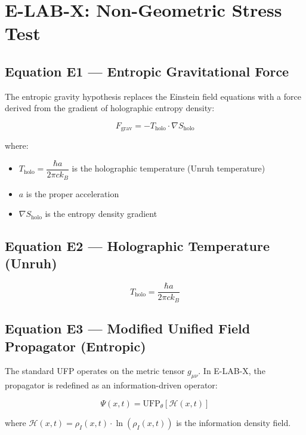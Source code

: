 
\section{E-LAB-X: Non-Geometric Stress Test}

\subsection{Equation E1 — Entropic Gravitational Force}

The entropic gravity hypothesis replaces the Einstein field equations with a force derived from the gradient of holographic entropy density:

\[
F_{\text{grav}} = -T_{\text{holo}} \cdot \nabla S_{\text{holo}}
\]

where:
\begin{itemize}
    \item $T_{\text{holo}} = \dfrac{\hbar a}{2\pi c k_B}$ is the holographic temperature (Unruh temperature)
    \item $a$ is the proper acceleration
    \item $\nabla S_{\text{holo}}$ is the entropy density gradient
\end{itemize}

\subsection{Equation E2 — Holographic Temperature (Unruh)}

\[
T_{\text{holo}} = \frac{\hbar a}{2\pi c k_B}
\]

\subsection{Equation E3 — Modified Unified Field Propagator (Entropic)}

The standard UFP operates on the metric tensor $g_{\mu\nu}$. In E-LAB-X, the propagator is redefined as an information-driven operator:

\[
\Psi(x,t) = \text{UFP}_{\theta}[\mathcal{H}(x,t)]
\]

where $\mathcal{H}(x,t) = \rho_I(x,t) \cdot \ln(\rho_I(x,t))$ is the information density field.

